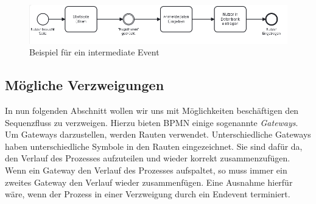 \begin{figure}
\centering
\includegraphics[scale=0.6]{Figures/Beispiel3}
\decoRule
\caption[Intermediate Events]{Beispiel für ein intermediate Event}
\label{fig:Task}
\end{figure}

\subsection{Mögliche Verzweigungen}
 
In nun folgenden Abschnitt wollen wir uns mit Möglichkeiten beschäftigen den Sequenzfluss zu verzweigen. Hierzu bieten BPMN einige sogenannte \emph{Gateways}. Um Gateways darzustellen, werden Rauten verwendet. Unterschiedliche Gateways haben unterschiedliche Symbole in den Rauten eingezeichnet. Sie sind dafür da, den Verlauf des Prozesses aufzuteilen und wieder korrekt zusammenzufügen. Wenn ein Gateway den Verlauf des Prozesses aufspaltet, so muss immer ein zweites Gateway den Verlauf wieder zusammenfügen. Eine Ausnahme hierfür wäre, wenn der Prozess in einer Verzweigung durch ein Endevent terminiert.
